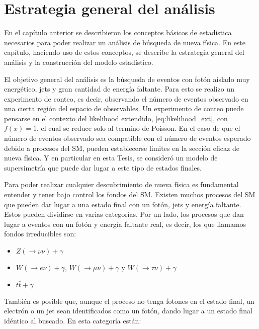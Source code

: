\chapter{Estrategia general del análisis}

En el capítulo anterior se describieron los conceptos básicos de estadística
necesarios para poder realizar un análisis de búsqueda de nueva física. En este
capítulo, haciendo uso de estos conceptos, se describe la estrategia general del
análisis y la construcción del modelo estadístico.

El objetivo general del análisis es la búsqueda de eventos con fotón aislado muy
energético, jets y gran cantidad de energía faltante. Para esto se realizo un
experimento de conteo, es decir, observando el número de eventos observado en
una cierta región del espacio de observables. Un experimento de conteo puede
pensarse en el contexto del likelihood extendido, \cref{eq:likelihood_ext}, con
$f(x) = 1$, el cual se reduce solo al termino de Poisson. En el caso de que el
número de eventos observado sea compatible con el número de eventos esperado
debido a procesos del SM, pueden establecerse limites en la sección eficaz
de nueva física. Y en particular en esta Tesis, se consideró un modelo
de supersimetría que puede dar lugar a este tipo de estados finales.%

Para poder realizar cualquier descubrimiento de nueva física es fundamental entender
y tener bajo control los fondos del SM.
Existen muchos procesos del SM que pueden dar lugar a una estado final con un fotón,
jets y energía faltante. Estos pueden dividirse en varias categorías. Por un lado, los
procesos que dan lugar a eventos con un fotón y energía faltante real, es decir, los
que llamamos fondos irreducibles son:

\begin{itemize}
\item $Z(\to\nu\nu)+\gamma$
\item $W(\to e\nu)+\gamma$, $W(\to\mu\nu)+\gamma$ y $W(\to \tau\nu)+\gamma$ %
\item $t\bar{t}+\gamma$ %
\end{itemize}
%
También es posible que, aunque el proceso no tenga fotones en el estado final, un
electrón o un jet sean identificados como un fotón, dando lugar a un estado final
idéntico al buscado. En esta categoría están:

